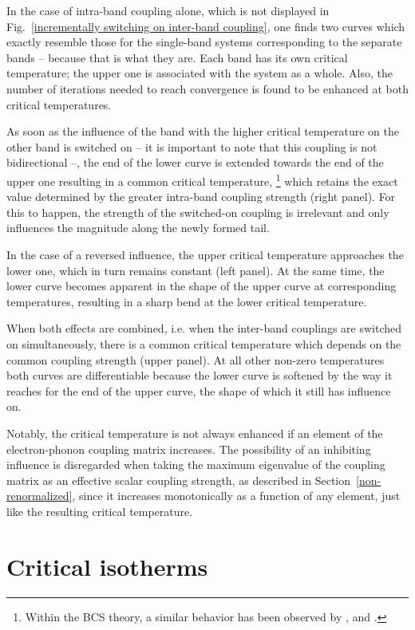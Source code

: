 In the case of intra-band coupling alone, which is not displayed in
Fig.~\ref{incrementally switching on inter-band coupling}, one finds two curves
which exactly resemble those for the single-band systems corresponding to the
separate bands -- because that is what they are. Each band has its own critical
temperature; the upper one is associated with the system as a whole. Also, the
number of iterations needed to reach convergence is found to be enhanced at both
critical temperatures.

As soon as the influence of the band with the higher critical temperature on the
other band is switched on -- it is important to note that this coupling is not
bidirectional --, the end of the lower curve is extended towards the end of the
upper one resulting in a common critical temperature,%
%
\footnote{Within the BCS theory, a similar behavior has been observed by
,  and 
\cite[Fig.~2]{SuhlMatthiasWalker59}.}
%
which retains the exact value determined by the greater intra-band coupling
strength (right panel). For this to happen, the strength of the switched-on
coupling is irrelevant and only influences the magnitude along the newly formed
tail.

In the case of a reversed influence, the upper critical temperature approaches
the lower one, which in turn remains constant (left panel). At the same time,
the lower curve becomes apparent in the shape of the upper curve at
corresponding temperatures, resulting in a sharp bend at the lower critical
temperature.

When both effects are combined, i.e. when the inter-band couplings are switched
on simultaneously, there is a common critical temperature which depends on the
common coupling strength (upper panel). At all other non-zero temperatures both
curves are differentiable because the lower curve is softened by the way it
reaches for the end of the upper curve, the shape of which it still has
influence on.

Notably, the critical temperature is not always enhanced if an element of the
electron-phonon coupling matrix increases. The possibility of an inhibiting
influence is disregarded when taking the maximum eigenvalue of the coupling
matrix as an effective scalar coupling strength, as described in
Section~\ref{non-renormalized}, since it increases monotonically as a function
of any element, just like the resulting critical temperature.

\section{Critical isotherms}

